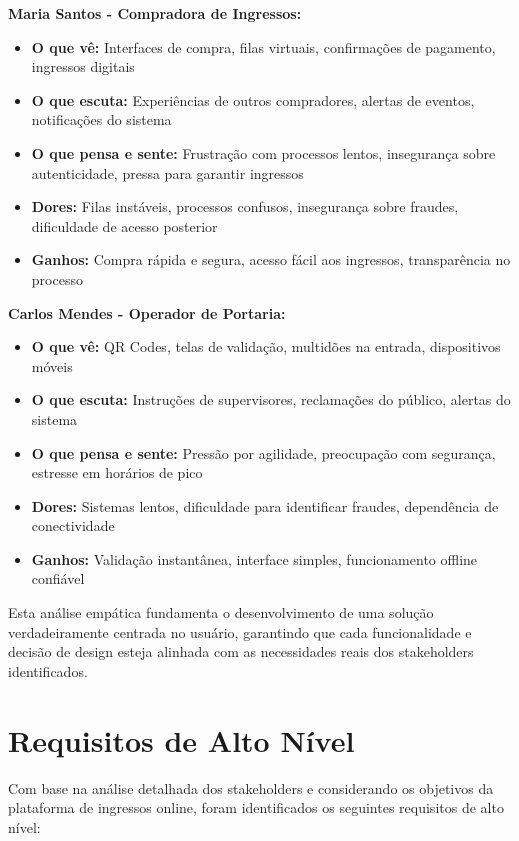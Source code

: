 \textbf{Maria Santos - Compradora de Ingressos:}
\begin{itemize}
    \item \textbf{O que vê:} Interfaces de compra, filas virtuais, confirmações de pagamento, ingressos digitais
    \item \textbf{O que escuta:} Experiências de outros compradores, alertas de eventos, notificações do sistema
    \item \textbf{O que pensa e sente:} Frustração com processos lentos, insegurança sobre autenticidade, pressa para garantir ingressos
    \item \textbf{Dores:} Filas instáveis, processos confusos, insegurança sobre fraudes, dificuldade de acesso posterior
    \item \textbf{Ganhos:} Compra rápida e segura, acesso fácil aos ingressos, transparência no processo
\end{itemize}

\textbf{Carlos Mendes - Operador de Portaria:}
\begin{itemize}
    \item \textbf{O que vê:} QR Codes, telas de validação, multidões na entrada, dispositivos móveis
    \item \textbf{O que escuta:} Instruções de supervisores, reclamações do público, alertas do sistema
    \item \textbf{O que pensa e sente:} Pressão por agilidade, preocupação com segurança, estresse em horários de pico
    \item \textbf{Dores:} Sistemas lentos, dificuldade para identificar fraudes, dependência de conectividade
    \item \textbf{Ganhos:} Validação instantânea, interface simples, funcionamento offline confiável
\end{itemize}

Esta análise empática fundamenta o desenvolvimento de uma solução verdadeiramente centrada no usuário, garantindo que cada funcionalidade e decisão de design esteja alinhada com as necessidades reais dos stakeholders identificados.

\section{Requisitos de Alto Nível}

Com base na análise detalhada dos stakeholders e considerando os objetivos da plataforma de ingressos online, foram identificados os seguintes requisitos de alto nível:

